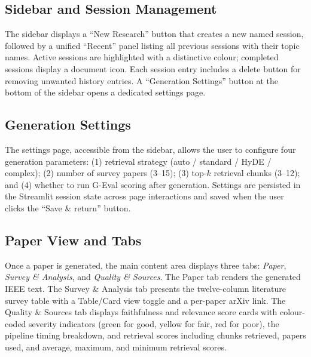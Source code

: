 \documentclass[12pt, a4paper]{article}
\begin{document}
\subsection{Sidebar and Session Management}

The sidebar displays a ``New Research'' button that creates a new named session,
followed by a unified ``Recent'' panel listing all previous sessions with their
topic names. Active sessions are highlighted with a distinctive colour; completed
sessions display a document icon. Each session entry includes a delete button for
removing unwanted history entries. A ``Generation Settings'' button at the bottom
of the sidebar opens a dedicated settings page.

\subsection{Generation Settings}

The settings page, accessible from the sidebar, allows the user to configure four
generation parameters: (1) retrieval strategy (auto / standard / HyDE / complex);
(2) number of survey papers (3--15); (3) top-$k$ retrieval chunks (3--12); and
(4) whether to run G-Eval scoring after generation. Settings are persisted in the
Streamlit session state across page interactions and saved when the user clicks the
``Save \& return'' button.

\subsection{Paper View and Tabs}

Once a paper is generated, the main content area displays three tabs:
\textit{Paper}, \textit{Survey \& Analysis}, and \textit{Quality \& Sources}.
The Paper tab renders the generated IEEE text. The Survey \& Analysis tab presents
the twelve-column literature survey table with a Table/Card view toggle and a
per-paper arXiv link. The Quality \& Sources tab displays faithfulness and relevance
score cards with colour-coded severity indicators (green for good, yellow for fair,
red for poor), the pipeline timing breakdown, and retrieval scores including chunks
retrieved, papers used, and average, maximum, and minimum retrieval scores.
\end{document}
